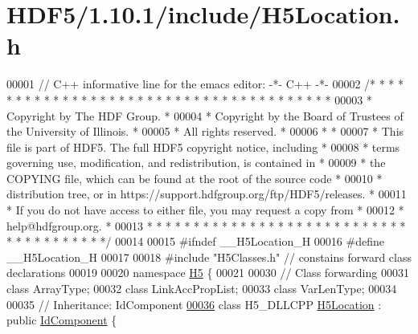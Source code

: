 \hypertarget{_h_d_f5_21_810_81_2include_2_h5_location_8h_source}{}\section{H\+D\+F5/1.10.1/include/\+H5\+Location.h}
\label{_h_d_f5_21_810_81_2include_2_h5_location_8h_source}

\begin{DoxyCode}
00001 \textcolor{comment}{// C++ informative line for the emacs editor: -*- C++ -*-}
00002 \textcolor{comment}{/* * * * * * * * * * * * * * * * * * * * * * * * * * * * * * * * * * * * * * *}
00003 \textcolor{comment}{ * Copyright by The HDF Group.                                               *}
00004 \textcolor{comment}{ * Copyright by the Board of Trustees of the University of Illinois.         *}
00005 \textcolor{comment}{ * All rights reserved.                                                      *}
00006 \textcolor{comment}{ *                                                                           *}
00007 \textcolor{comment}{ * This file is part of HDF5.  The full HDF5 copyright notice, including     *}
00008 \textcolor{comment}{ * terms governing use, modification, and redistribution, is contained in    *}
00009 \textcolor{comment}{ * the COPYING file, which can be found at the root of the source code       *}
00010 \textcolor{comment}{ * distribution tree, or in https://support.hdfgroup.org/ftp/HDF5/releases.  *}
00011 \textcolor{comment}{ * If you do not have access to either file, you may request a copy from     *}
00012 \textcolor{comment}{ * help@hdfgroup.org.                                                        *}
00013 \textcolor{comment}{ * * * * * * * * * * * * * * * * * * * * * * * * * * * * * * * * * * * * * * */}
00014 
00015 \textcolor{preprocessor}{#ifndef \_\_H5Location\_H}
00016 \textcolor{preprocessor}{#define \_\_H5Location\_H}
00017 
00018 \textcolor{preprocessor}{#include "H5Classes.h"}        \textcolor{comment}{// constains forward class declarations}
00019 
00020 \textcolor{keyword}{namespace }\hyperlink{namespace_h5}{H5} \{
00021 
00030 \textcolor{comment}{// Class forwarding}
00031 \textcolor{keyword}{class }ArrayType;
00032 \textcolor{keyword}{class }LinkAccPropList;
00033 \textcolor{keyword}{class }VarLenType;
00034 
00035 \textcolor{comment}{//  Inheritance: IdComponent}
\hyperlink{class_h5_1_1_h5_location}{00036} \textcolor{keyword}{class }H5\_DLLCPP \hyperlink{class_h5_1_1_h5_location}{H5Location} : \textcolor{keyword}{public} \hyperlink{class_h5_1_1_id_component}{IdComponent} \{

\end{DoxyCode}
